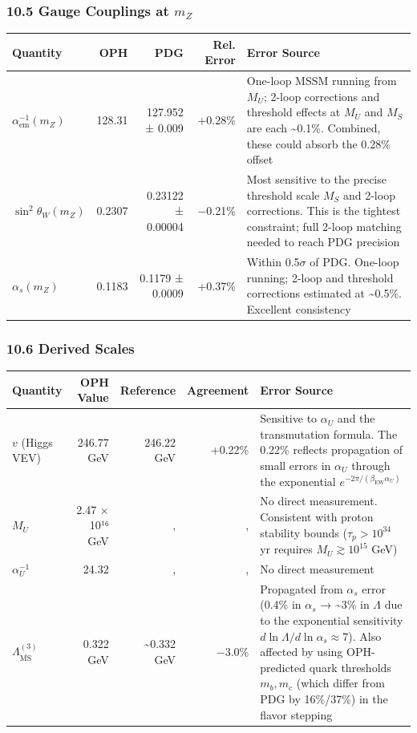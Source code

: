 \subsubsection{\texorpdfstring{10.5 Gauge Couplings at \(m_Z\)}{10.5 Gauge Couplings at m\_Z}}\label{105-gauge-couplings-at-m_z}

{\def\LTcaptype{none} %
\begin{longtable}[]{@{}lrrrl@{}}
\toprule\noalign{}
Quantity & OPH & PDG & Rel. Error & Error Source \\
\midrule\noalign{}
\endhead
\bottomrule\noalign{}
\endlastfoot
\(\alpha_{\text{em}}^{-1}(m_Z)\) & 128.31 & 127.952 ± 0.009 & +0.28\% & One-loop MSSM running from \(M_U\); 2-loop corrections and threshold effects at \(M_U\) and \(M_S\) are each \textasciitilde0.1\%. Combined, these could absorb the 0.28\% offset \\
\(\sin^2\theta_W(m_Z)\) & 0.2307 & 0.23122 ± 0.00004 & −0.21\% & Most sensitive to the precise threshold scale \(M_S\) and 2-loop corrections. This is the tightest constraint; full 2-loop matching needed to reach PDG precision \\
\(\alpha_s(m_Z)\) & 0.1183 & 0.1179 ± 0.0009 & +0.37\% & Within 0.5\(\sigma\) of PDG. One-loop running; 2-loop and threshold corrections estimated at \textasciitilde0.5\%. Excellent consistency \\
\end{longtable}
}

\subsubsection{10.6 Derived Scales}\label{106-derived-scales}

{\def\LTcaptype{none} %
\begin{longtable}[]{@{}lrrrl@{}}
\toprule\noalign{}
Quantity & OPH Value & Reference & Agreement & Error Source \\
\midrule\noalign{}
\endhead
\bottomrule\noalign{}
\endlastfoot
\(v\) (Higgs VEV) & 246.77 GeV & 246.22 GeV & +0.22\% & Sensitive to \(\alpha_U\) and the transmutation formula. The 0.22\% reflects propagation of small errors in \(\alpha_U\) through the exponential \(e^{-2\pi/(\beta_{\text{EW}} \alpha_U)}\) \\
\(M_U\) & 2.47 × 10¹⁶ GeV & , & , & No direct measurement. Consistent with proton stability bounds (\(\tau_p > 10^{34}\) yr requires \(M_U \gtrsim 10^{15}\) GeV) \\
\(\alpha_U^{-1}\) & 24.32 & , & , & No direct measurement \\
\(\Lambda_{\overline{\text{MS}}}^{(3)}\) & 0.322 GeV & \textasciitilde0.332 GeV & −3.0\% & Propagated from \(\alpha_s\) error (0.4\% in \(\alpha_s\) → \textasciitilde3\% in \(\Lambda\) due to the exponential sensitivity \(d\ln\Lambda/d\ln\alpha_s \approx 7\)). Also affected by using OPH-predicted quark thresholds \(m_b, m_c\) (which differ from PDG by 16\%/37\%) in the flavor stepping \\
\end{longtable}
}

